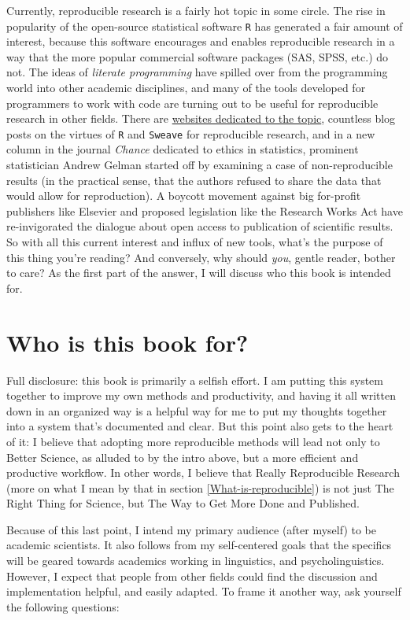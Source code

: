 \documentclass{book}
\begin{document}
Currently, reproducible research is a fairly hot topic in some circle. The rise in popularity of the open-source statistical software \texttt{R} has generated a fair amount of interest, because this software encourages and enables reproducible research in a way that the more popular commercial software packages (SAS, SPSS, etc.) do not. The ideas of \emph{literate programming} \parencite{knuth1984literate} have spilled over from the programming world into other academic disciplines, and many of the tools developed for programmers to work with code are turning out to be useful for reproducible research in other fields.  There are \href{http://reproducibleresearch.org/}{websites dedicated to the topic}, countless blog posts on the virtues of \texttt{R} and \texttt{Sweave} for reproducible research, and in a new column in the journal \emph{Chance} dedicated to ethics in statistics, prominent statistician Andrew Gelman started off by examining a case of non-reproducible results (in the practical sense, that the authors refused to share the data that would allow for reproduction). A boycott movement against big for-profit publishers like Elsevier and proposed legislation like the Research Works Act have re-invigorated the dialogue about open access to publication of scientific results. So with all this current interest and influx of new tools, what's the purpose of this thing you're reading?  And conversely, why should \emph{you}, gentle reader, bother to care?  As the first part of the answer, I will discuss who this book is intended for.
\section{Who is this book for?}
\label{sec-2-4}

Full disclosure: this book is primarily a selfish effort. I am putting this system together to improve my own methods and productivity, and having it all written down in an organized way is a helpful way for me to put my thoughts together into a system that's documented and clear. But this point also gets to the heart of it: I believe that adopting more reproducible methods will lead not only to Better Science, as alluded to by the intro above, but a more efficient and productive workflow. In other words, I believe that Really Reproducible Research (more on what I mean by that in section \ref{What-is-reproducible}) is not just The Right Thing for Science, but The Way to Get More Done and Published.

Because of this last point, I intend my primary audience (after myself) to be academic scientists. It also follows from my self-centered goals that the specifics will be geared towards academics working in linguistics, and psycholinguistics. However, I expect that people from other fields could find the discussion and implementation helpful, and easily adapted. To frame it another way, ask yourself the following questions:
\end{document}
